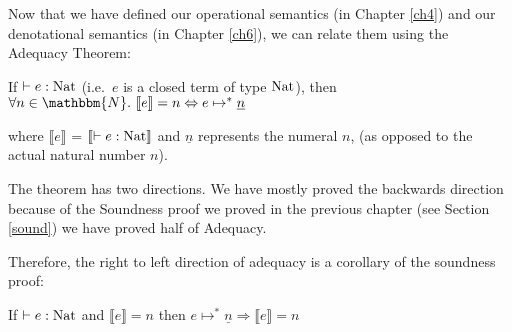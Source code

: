 Now that we have defined our operational semantics (in  Chapter \ref{ch4}) and our denotational semantics (in Chapter \ref{ch6}), we can relate them using the Adequacy Theorem: 

\vspace{1cm}
\begin{thm}\label{adeq}
If $\vdash e : \operatorname{Nat}$ (i.e.\ $e$ is a closed term of type $\operatorname{Nat}$), then $\forall n \in \mathbbm{N}. \ \llbracket e \rrbracket = n \Leftrightarrow e \mapsto^* \underline{n}$
\end{thm}

\vspace{0.5cm}

where $\llbracket e \rrbracket$ = $\llbracket \vdash e : \operatorname{Nat} \rrbracket$ and $\underline{n}$ represents the numeral $n$, (as opposed to the actual natural number $n$).

\vspace{0.5cm}


The theorem has two directions. We have mostly proved the backwards direction because of the Soundness proof we proved in the previous chapter (see Section \ref{sound}) we have proved half of Adequacy.

Therefore, the right to left direction of adequacy is a corollary of the soundness proof:

\vspace{0.5cm}

\begin{cor}
If $\vdash e : \operatorname{Nat}$ and $\llbracket e \rrbracket = n$ then $e \mapsto^* \underline{n} \Rightarrow \llbracket e \rrbracket = n$
\end{cor}


